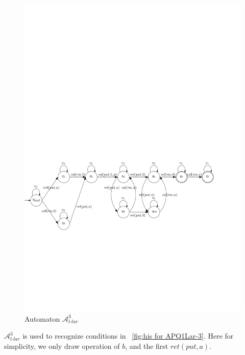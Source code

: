 \begin{figure}[htbp]
  \centering
  \includegraphics[width=1 \textwidth]{figures/PIC_AUTO_PQ1Lar-rppr.pdf}
  \caption{Automaton $\mathcal{A}_{\textit{l-lar}}^3$}
  \label{fig:automata APQ1Lar-3}
\end{figure}


$\mathcal{A}_{\textit{l-lar}}^3$ is used to recognize conditions in \figurename~\ref{fig:his for APQ1Lar-3}. Here for simplicity, we only draw operation of $b$, and the first $\textit{ret}(\textit{put},a)$.


